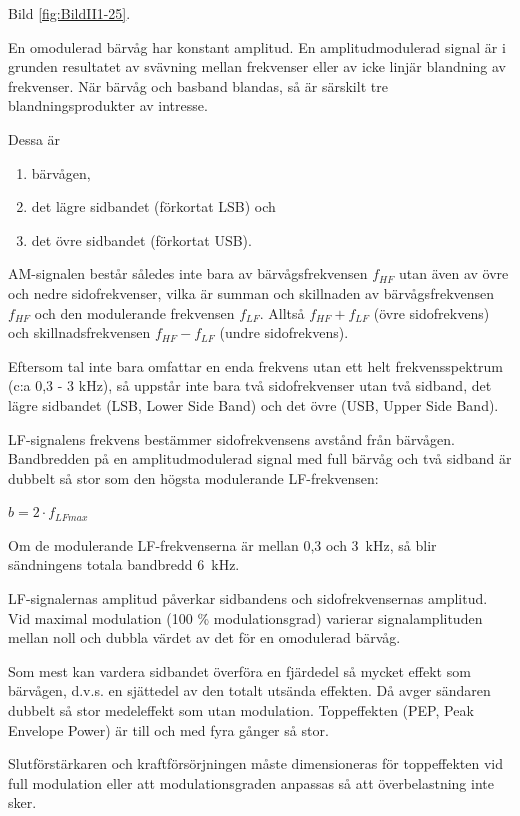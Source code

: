 Bild \ref{fig:BildII1-25}.

En omodulerad bärvåg har konstant amplitud. En amplitudmodulerad signal är i
grunden resultatet av svävning mellan frekvenser eller av icke linjär blandning
av frekvenser. När  bärvåg och basband blandas, så är särskilt tre
blandningsprodukter av intresse.

Dessa är

\begin{enumerate}[label=-,noitemsep]
\item bärvågen,
\item det lägre sidbandet (förkortat LSB) och
\item det övre sidbandet (förkortat USB).
\end{enumerate}

AM-signalen består således inte bara av bärvågsfrekvensen \(f_{HF}\) utan även
av övre och nedre sidofrekvenser, vilka är summan och skillnaden av
bärvågsfrekvensen \(f_{HF}\) och den modulerande frekvensen \(f_{LF}\).
Alltså \(f_{HF} + f_{LF}\) (övre sidofrekvens) och skillnadsfrekvensen
\(f_{HF} - f_{LF}\) (undre sidofrekvens).

Eftersom tal inte bara omfattar en enda frekvens utan ett helt frekvensspektrum
(c:a 0,3 - 3 kHz), så uppstår inte bara två sidofrekvenser utan två sidband, det
lägre sidbandet (LSB, Lower Side Band) och det övre (USB, Upper Side Band).

LF-signalens frekvens bestämmer sidofrekvensens avstånd från bärvågen.
Bandbredden på en amplitudmodulerad signal med full bärvåg och två sidband är
dubbelt så stor som den högsta modulerande LF-frekvensen:

\(b= 2 \cdot f_{LFmax}\)

Om de modulerande LF-frekvenserna är mellan 0,3 och 3~kHz, så blir sändningens
totala bandbredd 6~kHz.

LF-signalernas amplitud påverkar sidbandens och sidofrekvensernas amplitud. Vid
maximal modulation (100 \% modulationsgrad) varierar signalamplituden mellan
noll och dubbla värdet av det för en omodulerad bärvåg.

Som mest kan vardera sidbandet överföra en fjärdedel så mycket effekt som
bärvågen, d.v.s. en sjättedel av den totalt utsända effekten. Då avger sändaren
dubbelt så stor medeleffekt som utan modulation. Toppeffekten (PEP,
Peak Envelope Power) är till och med fyra gånger så stor.

Slutförstärkaren och kraftförsörjningen måste dimensioneras för toppeffekten vid
full modulation eller att modulationsgraden anpassas så att överbelastning inte
sker.

